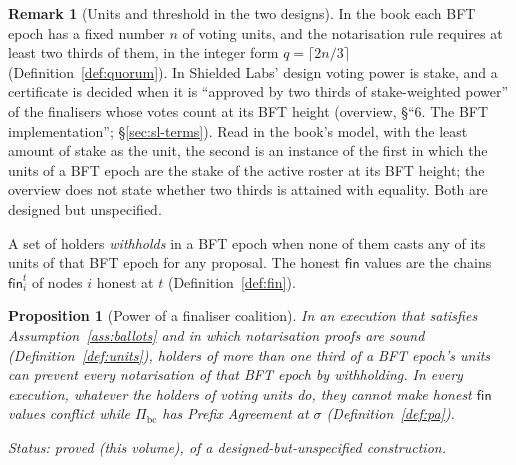 \documentclass[11pt,a4paper]{article}
\newtheorem{proposition}[theorem]{Proposition}
\theoremstyle{definition}
\newtheorem{remark}[theorem]{Remark}
\newcommand{\bc}{\mathrm{bc}}
\newcommand{\Pibc}{\Pi_{\bc}}
\newcommand{\fin}{\mathsf{fin}}
\begin{document}
\begin{remark}[Units and threshold in the two designs]\label{rem:units-designs}
In the book each BFT epoch has a fixed number $n$ of voting units, and the
notarisation rule requires at least two thirds of them, in the integer form
$q = \lceil 2n/3 \rceil$ (Definition~\ref{def:quorum}). In Shielded Labs'
design voting power is stake, and a certificate is decided when it is
``approved by two thirds of stake-weighted power'' of the finalisers whose
votes count at its BFT height (overview, \S``6. The BFT implementation'';
\S\ref{sec:sl-terms}). Read in the book's model, with the least amount of
stake as the unit, the second is an instance of the first in which the units
of a BFT epoch are the stake of the active roster at its BFT height; the
overview does not state whether two thirds is attained with equality. Both are
designed but unspecified.
\end{remark}

A set of holders \emph{withholds} in a BFT epoch when none of them casts any
of its units of that BFT epoch for any proposal. The honest $\fin$ values are
the chains $\fin_i^t$ of nodes $i$ honest at $t$ (Definition~\ref{def:fin}).

\begin{proposition}[Power of a finaliser coalition]\label{prop:coalition}
In an execution that satisfies Assumption~\ref{ass:ballots} and in which
notarisation proofs are sound (Definition~\ref{def:units}), holders of more
than one third of a BFT epoch's units can prevent every notarisation of that
BFT epoch by withholding. In every execution, whatever the holders of voting
units do, they cannot make honest $\fin$ values conflict while $\Pibc$ has
Prefix Agreement at $\sigma$ (Definition~\ref{def:pa}).

Status: proved (this volume), of a designed-but-unspecified construction.
\end{proposition}
\end{document}
